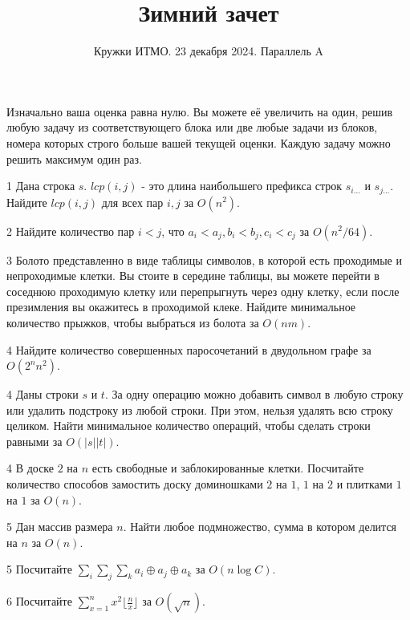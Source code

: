 \documentclass{article}
\title{Зимний зачет}
\author{Кружки ИТМО. 23 декабря 2024. Параллель A}
\date{}
\begin{document}
	
	\maketitle
	
	Изначально ваша оценка равна нулю. Вы можете её увеличить на один, решив любую задачу из соответствующего блока или две любые задачи из блоков, номера которых строго больше вашей текущей оценки. Каждую задачу можно решить максимум один раз.
	
	
	\begin{tasks}

		\item[1] Дана строка $s$. $lcp(i, j)$ - это длина наибольшего префикса строк $s_{i...}$ и $s_{j...}$. Найдите $lcp(i, j)$ для всех пар $i, j$ за $O(n^2)$.

		\item[2] Найдите количество пар $i < j$, что $a_i < a_j, b_i < b_j, c_i < c_j$ за $O(n^2/64)$.
		
		\item[3] Болото представленно в виде таблицы символов, в которой есть проходимые и непроходимые клетки. Вы стоите в середине таблицы, вы можете перейти в соседнюю проходимую клетку или перепрыгнуть через одну клетку, если после презимления вы окажитесь в проходимой клеке. Найдите минимальное количество прыжков, чтобы выбраться из болота за $O(nm)$.
		
		\item[4] Найдите количество совершенных паросочетаний в двудольном графе за $O(2^n n^2)$.

		\item[4] Даны строки $s$ и $t$. За одну операцию можно добавить символ в любую строку или удалить подстроку из любой строки. При этом, нельзя удалять всю строку целиком. Найти минимальное количество операций, чтобы сделать строки равными за $O(|s| |t|)$.
		
		
		\item[4] В доске $2$ на $n$ есть свободные и заблокированные клетки. Посчитайте количество способов замостить доску доминошками $2$ на $1$, $1$ на $2$ и плитками $1$ на $1$ за $O(n)$.
		
		
		\item[5] Дан массив размера $n$. Найти любое подмножество, сумма в котором делится на $n$ за $O(n)$.

		\item[5] Посчитайте $\sum_i \sum_j \sum_k a_i \oplus a_j \oplus a_k$ за $O(n \log C)$.

		\item[6] Посчитайте $\sum_{x = 1}^{n} x^2 \lfloor \frac{n}{x} \rfloor$ за $O(\sqrt n)$.


\end{tasks}
\end{document}
